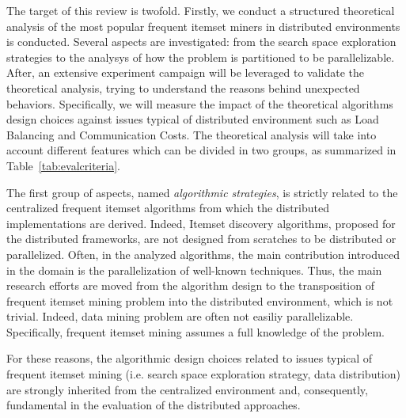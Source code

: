 The target of this review is twofold. Firstly, we conduct a structured theoretical analysis of the most popular frequent itemset miners in distributed environments is conducted. Several aspects are investigated: from the search space exploration strategies to the analysys of how the problem is partitioned to be parallelizable. After, an extensive experiment campaign will be leveraged to validate the theoretical analysis, trying to understand the reasons behind unexpected behaviors. Specifically, we will measure the impact of the theoretical algorithms design choices against issues typical of distributed environment such as Load Balancing and Communication Costs. 
The theoretical analysis will take into account different features which can be divided in two groups, as summarized in Table~\ref{tab:evalcriteria}.

The first group of aspects, named \textit{algorithmic strategies}, is strictly related to the centralized frequent itemset algorithms from which the distributed implementations are derived. Indeed, Itemset discovery algorithms, proposed for the distributed frameworks, are not designed from scratches to be distributed or parallelized. Often, in the analyzed algorithms, the main contribution introduced in the domain is the parallelization of well-known techniques. Thus, the main research efforts are moved from the algorithm design to the transposition of frequent itemset mining problem into the distributed environment, which is not trivial. Indeed, data mining problem are often not easiliy parallelizable. Specifically, frequent itemset mining assumes a full knowledge of the problem.

For these reasons, the algorithmic design choices related to issues typical of frequent itemset mining (i.e. search space exploration strategy, data distribution) are strongly inherited from the centralized environment and, consequently, fundamental in the evaluation of the distributed approaches.

